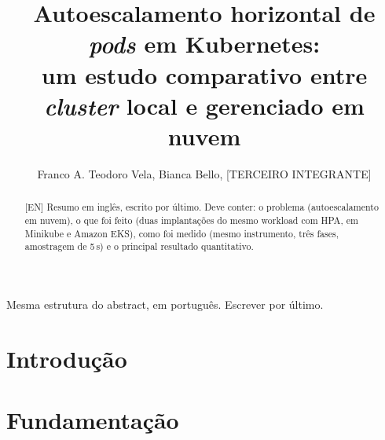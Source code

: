 \documentclass[12pt]{article}
\title{Autoescalamento horizontal de \textit{pods} em Kubernetes:\\
       um estudo comparativo entre \textit{cluster} local e gerenciado em nuvem}
\author{Franco A. Teodoro Vela\inst{1}, Bianca Bello\inst{1},
        [TERCEIRO INTEGRANTE]\inst{1}}
\begin{document}
\maketitle

\begin{abstract}
  [EN] Resumo em inglês, escrito por último. Deve conter: o problema
  (autoescalamento em nuvem), o que foi feito (duas implantações do mesmo
  workload com HPA, em Minikube e Amazon EKS), como foi medido (mesmo
  instrumento, três fases, amostragem de 5\,s) e o principal resultado
  quantitativo.
\end{abstract}

\begin{resumo}
  [PT] Mesma estrutura do abstract, em português. Escrever por último.
\end{resumo}

\section{Introdução}



\section{Fundamentação}
\end{document}
